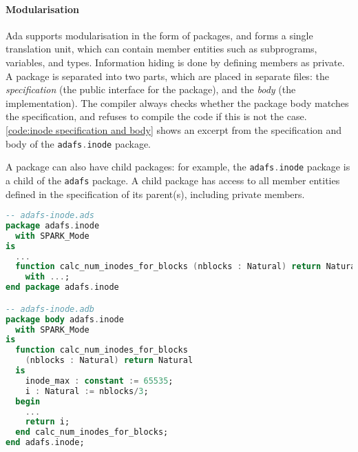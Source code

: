 \paragraph{Modularisation}
Ada supports modularisation in the form of packages, and forms a single translation unit, which can contain member entities such as subprograms, variables, and types.
Information hiding is done by defining members as private.
A package is separated into two parts, which are placed in separate files: the \textit{specification} (the public interface for the package), and the \textit{body} (the implementation).
The compiler always checks whether the package body matches the specification, and refuses to compile the code if this is not the case.
\autoref{code:inode specification and body} shows an excerpt from the specification and body of the \lstinline[language=Ada]{adafs.inode} package.

A package can also have child packages: for example, the \lstinline[language=Ada]{adafs.inode} package is a child of the \lstinline[language=Ada]{adafs} package.
A child package has access to all member entities defined in the specification of its parent(s), including private members.

\begin{lstlisting}[float=tb,caption={Excerpt from the adafs.inode package specification and body (ellipses denote code omitted for brevity)}, label={code:inode specification and body}, language=Ada]
-- adafs-inode.ads
package adafs.inode
  with SPARK_Mode
is
  ...
  function calc_num_inodes_for_blocks (nblocks : Natural) return Natural
    with ...;
end package adafs.inode

-- adafs-inode.adb
package body adafs.inode
  with SPARK_Mode
is
  function calc_num_inodes_for_blocks
    (nblocks : Natural) return Natural
  is
    inode_max : constant := 65535;
    i : Natural := nblocks/3;
  begin
    ...
    return i;
  end calc_num_inodes_for_blocks;
end adafs.inode;
\end{lstlisting}

